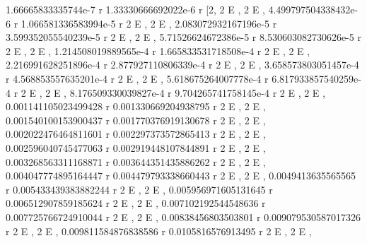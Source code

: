\documentclass[a4paper,10pt]{article}
\begin{document}
\begin{eulernotebook}
\begin{eulercomment}
\begin{eulercomment}
\begin{eulercomment}
\begin{eulercomment}
\begin{eulercomment}
\begin{eulercomment}
\begin{eulercomment}
\begin{eulercomment}
\begin{eulercomment}
\begin{eulercomment}
\begin{eulercomment}
\begin{eulercomment}
\begin{eulercomment}
\begin{eulercomment}
\begin{eulercomment}
\begin{eulercomment}
\begin{eulercomment}
\begin{eulercomment}
\begin{eulercomment}
\begin{eulercomment}
\begin{eulercomment}
\begin{eulercomment}
\begin{eulercomment}
\begin{eulercomment}
\begin{euleroutput}
  
                 1.66665833335744e-7 r     1.33330666692022e-6 r
          [2, 2 E                     , 2 E                     , 
     4.499797504338432e-6 r     1.066581336583994e-5 r
  2 E                      , 2 E                      , 
     2.083072932167196e-5 r     3.599352055540239e-5 r
  2 E                      , 2 E                      , 
     5.71526624672386e-5 r     8.530603082730626e-5 r
  2 E                     , 2 E                      , 
     1.214508019889565e-4 r     1.665833531718508e-4 r
  2 E                      , 2 E                      , 
     2.216991628251896e-4 r     2.877927110806339e-4 r
  2 E                      , 2 E                      , 
     3.658573803051457e-4 r     4.568853557635201e-4 r
  2 E                      , 2 E                      , 
     5.618675264007778e-4 r     6.817933857540259e-4 r
  2 E                      , 2 E                      , 
     8.176509330039827e-4 r     9.704265741758145e-4 r
  2 E                      , 2 E                      , 
     0.001141105023499428 r     0.001330669204938795 r
  2 E                      , 2 E                      , 
     0.001540100153900437 r     0.001770376919130678 r
  2 E                      , 2 E                      , 
     0.002022476464811601 r     0.002297373572865413 r
  2 E                      , 2 E                      , 
     0.002596040745477063 r     0.002919448107844891 r
  2 E                      , 2 E                      , 
     0.003268563311168871 r     0.003644351435886262 r
  2 E                      , 2 E                      , 
     0.004047774895164447 r     0.004479793338660443 r
  2 E                      , 2 E                      , 
     0.0049413635565565 r     0.005433439383882244 r
  2 E                    , 2 E                      , 
     0.005956971605131645 r     0.006512907859185624 r
  2 E                      , 2 E                      , 
     0.007102192544548636 r     0.007725766724910044 r
  2 E                      , 2 E                      , 
     0.00838456803503801 r     0.009079530587017326 r
  2 E                     , 2 E                      , 
     0.009811584876838586 r     0.0105816576913495 r
  2 E                      , 2 E                    , 

\end{euleroutput}
\end{eulercomment}
\end{eulercomment}
\end{eulercomment}
\end{eulercomment}
\end{eulercomment}
\end{eulercomment}
\end{eulercomment}
\end{eulercomment}
\end{eulercomment}
\end{eulercomment}
\end{eulercomment}
\end{eulercomment}
\end{eulercomment}
\end{eulercomment}
\end{eulercomment}
\end{eulercomment}
\end{eulercomment}
\end{eulercomment}
\end{eulercomment}
\end{eulercomment}
\end{eulercomment}
\end{eulercomment}
\end{eulercomment}
\end{eulercomment}
\end{eulernotebook}
\end{document}
